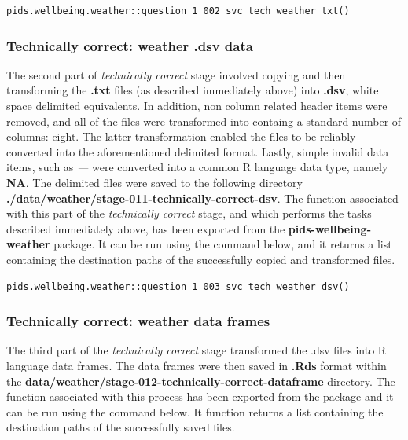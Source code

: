 \documentclass[12pt, oneside, openany]{book}
\begin{document}
\bigskip
\begin{lstlisting}
pids.wellbeing.weather::question_1_002_svc_tech_weather_txt()
\end{lstlisting}

\newpage
\subsubsection*{Technically correct: weather .dsv data}

The second part of \emph{technically correct} stage involved copying and then transforming the \textbf{.txt} files (as described immediately above) into \textbf{.dsv}, white space delimited equivalents. In addition, non column related header items were removed, and all of the files were transformed into containg a standard number of columns: eight. The latter transformation enabled the files to be reliably converted into the aforementioned delimited format. Lastly, simple invalid data items, such as \emph{---} were converted into a common R language data type, namely \textbf{NA}. The delimited files were saved to the following directory \textbf{./data/weather/stage-011-technically-correct-dsv}. The function associated with this part of the \emph{technically correct} stage, and which performs the tasks described immediately above, has been exported from the \textbf{pids-wellbeing-weather} package. It can be run using the command below, and it returns a list containing the destination paths of the successfully copied and transformed files.

\bigskip
\begin{lstlisting}
pids.wellbeing.weather::question_1_003_svc_tech_weather_dsv()
\end{lstlisting}

\subsubsection*{Technically correct: weather data frames}

The third part of the \emph{technically correct} stage transformed the .dsv files into R language data frames. The data frames were then saved in \textbf{.Rds} format within the \textbf{data/weather/stage-012-technically-correct-dataframe} directory. The function associated with this process has been exported from the package and it can be run using the command below. It function returns a list containing the destination paths of the successfully saved files.
\end{document}
